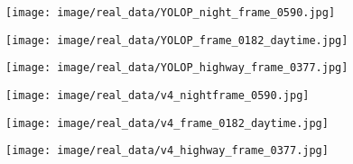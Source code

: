 \documentclass[lettersize,journal]{IEEEtran}
\begin{document}
{\begin{figure*}[!h]
    \begin{subfigure}[b]{0.05\textwidth}
        \centering
        \vspace{0.6cm} 
    \end{subfigure}\begin{subfigure}{0.25\textwidth}
        \centering
        \texttt{[image: image/real\_data/YOLOP\_night\_frame\_0590.jpg]}
    \end{subfigure}\hspace{0.5cm}
    \begin{subfigure}{0.25\textwidth}
        \centering
        \texttt{[image: image/real\_data/YOLOP\_frame\_0182\_daytime.jpg]}
    \end{subfigure}\hspace{0.5cm}
    \begin{subfigure}{0.25\textwidth}
        \centering
        \texttt{[image: image/real\_data/YOLOP\_highway\_frame\_0377.jpg]}
    \end{subfigure}
    
    \medskip
    
    \begin{subfigure}[b]{0.05\textwidth}
        \centering
        \vspace{0.2cm}
    \end{subfigure}\begin{subfigure}{0.25\textwidth}
        \centering
        \texttt{[image: image/real\_data/v4\_nightframe\_0590.jpg]}
    \end{subfigure}\hspace{0.5cm}
    \begin{subfigure}{0.25\textwidth}
        \centering
        \texttt{[image: image/real\_data/v4\_frame\_0182\_daytime.jpg]}
    \end{subfigure}\hspace{0.5cm}
    \begin{subfigure}{0.25\textwidth}
        \centering
        \texttt{[image: image/real\_data/v4\_highway\_frame\_0377.jpg]}
    \end{subfigure}

    \medskip
    

\end{figure*}}
\end{document}
